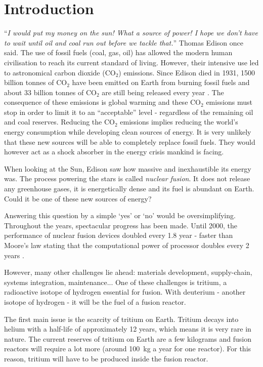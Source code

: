 \chapter*{Introduction}

``\textit{I would put my money on the sun! What a source of power! I hope we don't have to wait until oil and coal run out before we tackle that.}'' Thomas Edison once said.
The use of fossil fuels (coal, gas, oil) has allowed the modern human civilisation to reach its current standard of living.
However, their intensive use led to astronomical carbon dioxide (CO$_2$) emissions.
Since Edison died in 1931, 1500 billion tonnes of CO$_2$ have been emitted on Earth from burning fossil fuels and about 33 billion tonnes of CO$_2$ are still being released every year \cite{friedlingstein_global_2021}.
The consequence of these emissions is global warming and these CO$_2$ emissions must stop in order to limit it to an ``acceptable'' level - regardless of the remaining oil and coal reserves.
Reducing the CO$_2$ emissions implies reducing the world's energy consumption while developing clean sources of energy.
It is very unlikely that these new sources will be able to completely replace fossil fuels.
They would however act as a shock absorber in the energy crisis mankind is facing.

When looking at the Sun, Edison saw how massive and inexhaustible its energy was.
The process powering the stars is called \textit{nuclear fusion}.
It does not release any greenhouse gases, it is energetically dense and its fuel is abundant on Earth.
Could it be one of these new sources of energy?

Answering this question by a simple `yes' or `no' would be oversimplifying.
Throughout the years, spectacular progress has been made.
Until 2000, the performance of nuclear fusion devices doubled every 1.8 year - faster than Moore's law stating that the computational power of processor doubles every 2 years \cite{webster_fusion_2003}.

However, many other challenges lie ahead: materials development, supply-chain, systems integration, maintenance...
One of these challenges is tritium, a radioactive isotope of hydrogen essential for fusion.
With deuterium - another isotope of hydrogen - it will be the fuel of a fusion reactor.

The first main issue is the scarcity of tritium on Earth.
Tritium decays into helium with a half-life of approximately 12 years, which means it is very rare in nature.
The current reserves of tritium on Earth are a few kilograms and fusion reactors will require a lot more (around \SI{100}{kg} a year for one reactor).
For this reason, tritium will have to be produced inside the fusion reactor.

